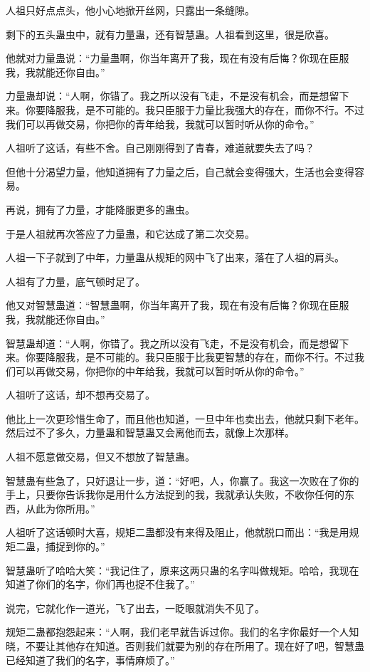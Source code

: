 \begin{this_body}
人祖只好点点头，他小心地掀开丝网，只露出一条缝隙。

剩下的五头蛊虫中，就有力量蛊，还有智慧蛊。人祖看到这里，很是欣喜。

他就对力量蛊说：“力量蛊啊，你当年离开了我，现在有没有后悔？你现在臣服我，我就能还你自由。”

力量蛊却说：“人啊，你错了。我之所以没有飞走，不是没有机会，而是想留下来。你要降服我，是不可能的。我只臣服于力量比我强大的存在，而你不行。不过我们可以再做交易，你把你的青年给我，我就可以暂时听从你的命令。”

人祖听了这话，有些不舍。自己刚刚得到了青春，难道就要失去了吗？

但他十分渴望力量，他知道拥有了力量之后，自己就会变得强大，生活也会变得容易。

再说，拥有了力量，才能降服更多的蛊虫。

于是人祖就再次答应了力量蛊，和它达成了第二次交易。

人祖一下子就到了中年，力量蛊从规矩的网中飞了出来，落在了人祖的肩头。

人祖有了力量，底气顿时足了。

他又对智慧蛊道：“智慧蛊啊，你当年离开了我，现在有没有后悔？你现在臣服我，我就能还你自由。”

智慧蛊却道：“人啊，你错了。我之所以没有飞走，不是没有机会，而是想留下来。你要降服我，是不可能的。我只臣服于比我更智慧的存在，而你不行。不过我们可以再做交易，你把你的中年给我，我就可以暂时听从你的命令。”

人祖听了这话，却不想再交易了。

他比上一次更珍惜生命了，而且他也知道，一旦中年也卖出去，他就只剩下老年。然后过不了多久，力量蛊和智慧蛊又会离他而去，就像上次那样。

人祖不愿意做交易，但又不想放了智慧蛊。

智慧蛊有些急了，只好退让一步，道：“好吧，人，你赢了。我这一次败在了你的手上，只要你告诉我你是用什么方法捉到的我，我就承认失败，不收你任何的东西，从此为你所用。”

人祖听了这话顿时大喜，规矩二蛊都没有来得及阻止，他就脱口而出：“我是用规矩二蛊，捕捉到你的。”

智慧蛊听了哈哈大笑：“我记住了，原来这两只蛊的名字叫做规矩。哈哈，我现在知道了你们的名字，你们再也捉不住我了。”

说完，它就化作一道光，飞了出去，一眨眼就消失不见了。

规矩二蛊都抱怨起来：“人啊，我们老早就告诉过你。我们的名字你最好一个人知晓，不要让其他存在知道。否则我们就要为别的存在所用了。现在好了吧，智慧蛊已经知道了我们的名字，事情麻烦了。”


\end{this_body}
